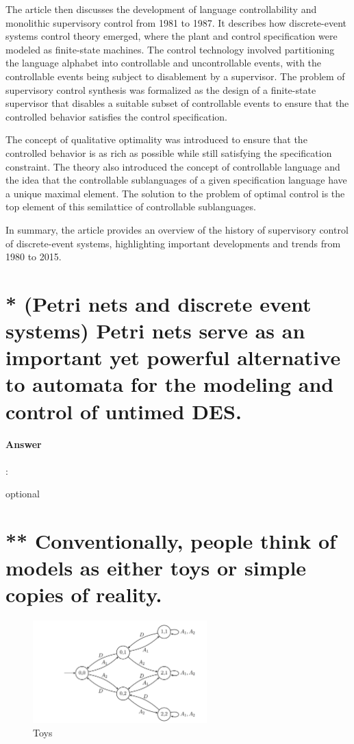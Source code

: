 \documentclass{article}
\begin{document}
The article then discusses the development of language controllability and monolithic supervisory control from 1981 to 1987. It describes how discrete-event systems control theory emerged, where the plant and control specification were modeled as finite-state machines. The control technology involved partitioning the language alphabet into controllable and uncontrollable events, with the controllable events being subject to disablement by a supervisor. The problem of supervisory control synthesis was formalized as the design of a finite-state supervisor that disables a suitable subset of controllable events to ensure that the controlled behavior satisfies the control specification.

The concept of qualitative optimality was introduced to ensure that the controlled behavior is as rich as possible while still satisfying the specification constraint. The theory also introduced the concept of controllable language and the idea that the controllable sublanguages of a given specification language have a unique maximal element. The solution to the problem of optimal control is the top element of this semilattice of controllable sublanguages.

In summary, the article provides an overview of the history of supervisory control of discrete-event systems, highlighting important developments and trends from 1980 to 2015.

\section{* (Petri nets and discrete event systems) Petri nets serve as an important yet powerful alternative to automata for the modeling and control of untimed DES.}

\paragraph{Answer}:

optional

\section{** Conventionally, people think of models as either toys or simple copies of reality.}

\begin{figure}[h!]
  \centering
  \includegraphics[width=0.6\textwidth]{assets/DES26.png}
  \caption{Toys}
  \label{fig:des26}
\end{figure}
\end{document}
